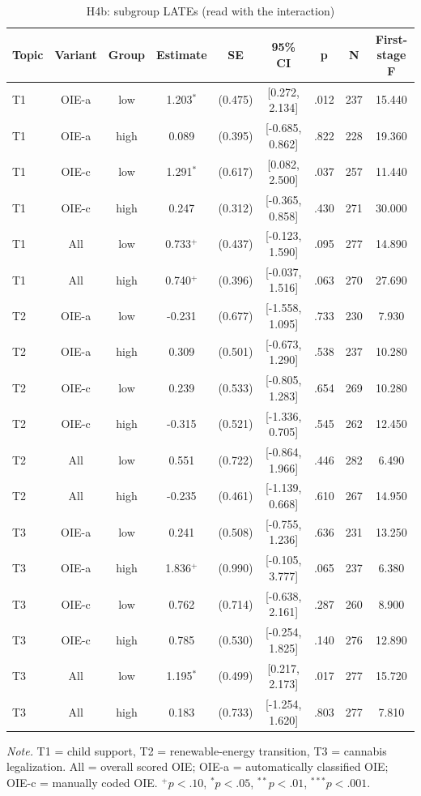 \begin{table}[htbp]
\centering
\begin{threeparttable}
\caption{H4b: subgroup LATEs (read with the interaction)}
\label{tab:tab_h4b_subgroups}
\begin{tabular}{lcccccccc}
\toprule
  Topic & Variant & Group & Estimate & SE & 95\% CI & p & N & First-stage F \\
\midrule
  T1 & OIE-a & low & 1.203$^{*}$ & (0.475) & [0.272, 2.134] & .012 & 237 & 15.440 \\
  T1 & OIE-a & high & 0.089 & (0.395) & [-0.685, 0.862] & .822 & 228 & 19.360 \\
  T1 & OIE-c & low & 1.291$^{*}$ & (0.617) & [0.082, 2.500] & .037 & 257 & 11.440 \\
  T1 & OIE-c & high & 0.247 & (0.312) & [-0.365, 0.858] & .430 & 271 & 30.000 \\
  T1 & All & low & 0.733$^{+}$ & (0.437) & [-0.123, 1.590] & .095 & 277 & 14.890 \\
  T1 & All & high & 0.740$^{+}$ & (0.396) & [-0.037, 1.516] & .063 & 270 & 27.690 \\
  T2 & OIE-a & low & -0.231 & (0.677) & [-1.558, 1.095] & .733 & 230 & 7.930 \\
  T2 & OIE-a & high & 0.309 & (0.501) & [-0.673, 1.290] & .538 & 237 & 10.280 \\
  T2 & OIE-c & low & 0.239 & (0.533) & [-0.805, 1.283] & .654 & 269 & 10.280 \\
  T2 & OIE-c & high & -0.315 & (0.521) & [-1.336, 0.705] & .545 & 262 & 12.450 \\
  T2 & All & low & 0.551 & (0.722) & [-0.864, 1.966] & .446 & 282 & 6.490 \\
  T2 & All & high & -0.235 & (0.461) & [-1.139, 0.668] & .610 & 267 & 14.950 \\
  T3 & OIE-a & low & 0.241 & (0.508) & [-0.755, 1.236] & .636 & 231 & 13.250 \\
  T3 & OIE-a & high & 1.836$^{+}$ & (0.990) & [-0.105, 3.777] & .065 & 237 & 6.380 \\
  T3 & OIE-c & low & 0.762 & (0.714) & [-0.638, 2.161] & .287 & 260 & 8.900 \\
  T3 & OIE-c & high & 0.785 & (0.530) & [-0.254, 1.825] & .140 & 276 & 12.890 \\
  T3 & All & low & 1.195$^{*}$ & (0.499) & [0.217, 2.173] & .017 & 277 & 15.720 \\
  T3 & All & high & 0.183 & (0.733) & [-1.254, 1.620] & .803 & 277 & 7.810 \\
\bottomrule
\end{tabular}
\begin{tablenotes}\footnotesize\item \textit{Note.} T1 = child support, T2 = renewable-energy transition, T3 = cannabis legalization. All = overall scored OIE; OIE-a = automatically classified OIE; OIE-c = manually coded OIE. $^{+}p<.10$, $^{*}p<.05$, $^{**}p<.01$, $^{***}p<.001$.\end{tablenotes}
\end{threeparttable}
\end{table}
